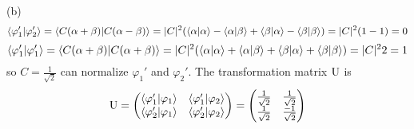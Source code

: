 \documentclass[a4paper]{article}
\begin{document}
(b) 
\[
\langle\varphi_1'|\varphi_2'\rangle=\langle C(\alpha+\beta)|C(\alpha-\beta)\rangle=|C|^2(\langle\alpha|\alpha\rangle-\langle\alpha|\beta\rangle+\langle\beta|\alpha\rangle-\langle\beta|\beta\rangle)=|C|^2(1-1)=0
\]
\[
\langle\varphi_1'|\varphi_1'\rangle=\langle C(\alpha+\beta)|C(\alpha+\beta)\rangle=|C|^2(\langle\alpha|\alpha\rangle+\langle\alpha|\beta\rangle+\langle\beta|\alpha\rangle+\langle\beta|\beta\rangle)=|C|^22=1
\]
so $C=\frac{1}{\sqrt{2}}$ can normalize $\varphi_1'$ and $\varphi_2'$. The transformation matrix $\mathrm{U}$ is
\[
\mathrm{U}=
\begin{pmatrix}
\langle\varphi_1'|\varphi_1\rangle&\langle\varphi_1'|\varphi_2\rangle\\
\langle\varphi_2'|\varphi_1\rangle&\langle\varphi_2'|\varphi_2\rangle
\end{pmatrix}=
\begin{pmatrix}
\frac{1}{\sqrt{2}}&\frac{1}{\sqrt{2}}\\
\frac{1}{\sqrt{2}}&\frac{-1}{\sqrt{2}}
\end{pmatrix}
\]
\end{document}
